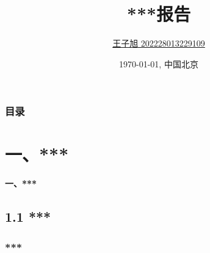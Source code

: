 \documentclass[10pt]{ctexbeamer}
\title[UCAS Beamer (\LaTeX{})]{***报告}
\author[G.\,Chen]{\href{mailto:icgw@outlook.com}{
王子旭 202228013229109}}
\institute[AMSS, CAS]{中国科学院计算技术研究所 \\ 数据智能系统研究中心}
\date[\today]{\today, 中国北京}
\begin{document}
\newcommand{\SubItem}[1]{
    {\setlength\itemindent{15pt} \item[-] #1}
}

\begin{frame}[plain]
  \maketitle
\end{frame}

\begin{frame}[t]
  \frametitle{目录}
  \begin{multicols}{2}
    \tableofcontents
    \end{multicols}
\end{frame}

\section[第一章]{一、***}\label{sec:1}
\begin{frame}
    \textbf{\LARGE 一、***}
\end{frame}
\subsection{1.1 ***}\label{subsec:1-1}
\begin{frame}
    \frametitle{***}
\end{frame}
\end{document}

